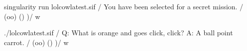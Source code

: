 \documentclass[letterpaper,10pt,english]{sphinxmanual}
\begin{document}
%
\begin{sphinxVerbatim}[commandchars=\\\{\}]
\PYGZdl{} singularity run lolcow\PYGZus{}latest.sif
 \PYGZus{}\PYGZus{}\PYGZus{}\PYGZus{}\PYGZus{}\PYGZus{}\PYGZus{}\PYGZus{}\PYGZus{}\PYGZus{}\PYGZus{}\PYGZus{}\PYGZus{}\PYGZus{}\PYGZus{}\PYGZus{}\PYGZus{}\PYGZus{}\PYGZus{}\PYGZus{}\PYGZus{}\PYGZus{}\PYGZus{}\PYGZus{}\PYGZus{}\PYGZus{}\PYGZus{}\PYGZus{}\PYGZus{}\PYGZus{}\PYGZus{}\PYGZus{}\PYGZus{}\PYGZus{}\PYGZus{}\PYGZus{}\PYGZus{}
/ You have been selected for a secret \PYGZbs{}
\PYGZbs{} mission.                            /
 \PYGZhy{}\PYGZhy{}\PYGZhy{}\PYGZhy{}\PYGZhy{}\PYGZhy{}\PYGZhy{}\PYGZhy{}\PYGZhy{}\PYGZhy{}\PYGZhy{}\PYGZhy{}\PYGZhy{}\PYGZhy{}\PYGZhy{}\PYGZhy{}\PYGZhy{}\PYGZhy{}\PYGZhy{}\PYGZhy{}\PYGZhy{}\PYGZhy{}\PYGZhy{}\PYGZhy{}\PYGZhy{}\PYGZhy{}\PYGZhy{}\PYGZhy{}\PYGZhy{}\PYGZhy{}\PYGZhy{}\PYGZhy{}\PYGZhy{}\PYGZhy{}\PYGZhy{}\PYGZhy{}\PYGZhy{}
        \PYGZbs{}   \PYGZca{}\PYGZus{}\PYGZus{}\PYGZca{}
         \PYGZbs{}  (oo)\PYGZbs{}\PYGZus{}\PYGZus{}\PYGZus{}\PYGZus{}\PYGZus{}\PYGZus{}\PYGZus{}
            (\PYGZus{}\PYGZus{})\PYGZbs{}       )\PYGZbs{}/\PYGZbs{}
                \textbar{}\textbar{}\PYGZhy{}\PYGZhy{}\PYGZhy{}\PYGZhy{}w \textbar{}
                \textbar{}\textbar{}     \textbar{}\textbar{}

\PYGZdl{} ./lolcow\PYGZus{}latest.sif
 \PYGZus{}\PYGZus{}\PYGZus{}\PYGZus{}\PYGZus{}\PYGZus{}\PYGZus{}\PYGZus{}\PYGZus{}\PYGZus{}\PYGZus{}\PYGZus{}\PYGZus{}\PYGZus{}\PYGZus{}\PYGZus{}\PYGZus{}\PYGZus{}\PYGZus{}\PYGZus{}\PYGZus{}\PYGZus{}\PYGZus{}\PYGZus{}\PYGZus{}\PYGZus{}\PYGZus{}\PYGZus{}\PYGZus{}\PYGZus{}\PYGZus{}\PYGZus{}\PYGZus{}\PYGZus{}\PYGZus{}\PYGZus{}
/ Q: What is orange and goes \PYGZdq{}click, \PYGZbs{}
\PYGZbs{} click?\PYGZdq{} A: A ball point carrot.    /
 \PYGZhy{}\PYGZhy{}\PYGZhy{}\PYGZhy{}\PYGZhy{}\PYGZhy{}\PYGZhy{}\PYGZhy{}\PYGZhy{}\PYGZhy{}\PYGZhy{}\PYGZhy{}\PYGZhy{}\PYGZhy{}\PYGZhy{}\PYGZhy{}\PYGZhy{}\PYGZhy{}\PYGZhy{}\PYGZhy{}\PYGZhy{}\PYGZhy{}\PYGZhy{}\PYGZhy{}\PYGZhy{}\PYGZhy{}\PYGZhy{}\PYGZhy{}\PYGZhy{}\PYGZhy{}\PYGZhy{}\PYGZhy{}\PYGZhy{}\PYGZhy{}\PYGZhy{}\PYGZhy{}
        \PYGZbs{}   \PYGZca{}\PYGZus{}\PYGZus{}\PYGZca{}
         \PYGZbs{}  (oo)\PYGZbs{}\PYGZus{}\PYGZus{}\PYGZus{}\PYGZus{}\PYGZus{}\PYGZus{}\PYGZus{}
            (\PYGZus{}\PYGZus{})\PYGZbs{}       )\PYGZbs{}/\PYGZbs{}
                \textbar{}\textbar{}\PYGZhy{}\PYGZhy{}\PYGZhy{}\PYGZhy{}w \textbar{}
                \textbar{}\textbar{}     \textbar{}\textbar{}
\end{sphinxVerbatim}
\end{document}
